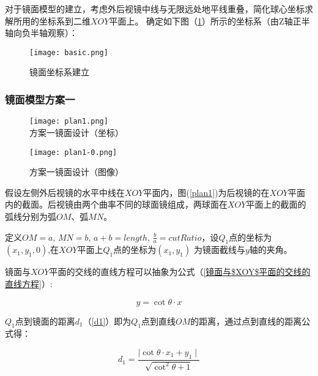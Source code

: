 \documentclass[withoutpreface,bwprint]{cumcmthesis} %
\begin{document}
\par 对于镜面模型的建立，考虑外后视镜中线与无限远处地平线重叠，简化球心坐标求解所用的坐标系到二维$XOY$平面上。 确定如下图（\ref{basic}）所示的坐标系（由Z轴正半轴向负半轴观察）：

\begin{figure}[!htb]
\centering
\texttt{[image: basic.png]}
\caption{镜面坐标系建立}
\label{basic}
\end{figure}


\subsubsection{镜面模型方案一}

\begin{figure}[!htbp]  
\begin{minipage}[t]{0.5\textwidth}
\centering  
\texttt{[image: plan1.png]} \\
\caption{方案一镜面设计（坐标）} \label{plan1}
\end{minipage}
\hspace{1ex}
\begin{minipage}[t]{0.5\textwidth}  
\centering  
\texttt{[image: plan1-0.png]}\\
\caption{方案一镜面设计（图像）}  \label{plan1-0}
\end{minipage}  
\end{figure} 


\par 假设左侧外后视镜的水平中线在$XOY$平面内，图(\ref{plan1})为后视镜的在$XOY$平面内的截面。后视镜由两个曲率不同的球面镜组成，两球面在$XOY$平面上的截面的弧线分别为弧$OM$、弧$MN$。

\par 定义$OM = a$, $MN = b$, $a + b = length$, $\frac{b}{a} = cutRatio$，设$Q_1$点的坐标为$(x_1,y_1,0)$,在$XOY$平面上$Q_1$点的坐标为$(x_1,y_1)$ 为镜面截线与$y$轴的夹角。

\par 镜面与$XOY$平面的交线的直线方程可以抽象为公式（\ref{镜面与$XOY$平面的交线的直线方程}）:
 
\begin{equation}
\label{镜面与$XOY$平面的交线的直线方程}
	y = \mathop{cot}\theta \cdot x
\end{equation}

$Q_1$点到镜面的距离$d_1$（\ref{d1}）即为$Q_1$点到直线$OM$的距离，通过点到直线的距离公式得：

\begin{equation}
\label{d1}
	d_1 = \frac{\mid \mathop{cot}\theta \cdot x_1 + y_1 \mid}{\sqrt{\mathop{cot}^{2} \theta + 1}} 
\end{equation}
\end{document}
